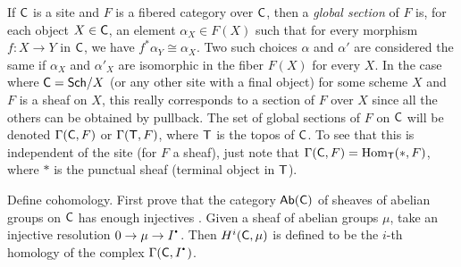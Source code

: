 

If $\text{\sf C}$ is a site and $F$ is a fibered category over $\text{\sf C}$, then a \emph{global section} of $F$ is, for each object $X\in \text{\sf C}$, an element $\alpha_X\in F(X)$ such that for every morphism $f:X\to Y$ in $\text{\sf C}$, we have $f^*\alpha_Y\cong\alpha_X$. Two such choices $\alpha$ and $\alpha'$ are considered the same if $\alpha_X$ and $\alpha'_X$ are isomorphic in the fiber $F(X)$ for every $X$. In the case where $\text{\sf C}=\text{\sf Sch}/X$ (or any other site with a final object) for some scheme $X$ and $F$ is a sheaf on $X$, this really corresponds to a section of $F$ over $X$ since all the others can be obtained by pullback. The set of global sections of $F$ on $\text{\sf C}$ will be denoted $\Gamma(\text{\sf C},F)$ or $\Gamma(\text{\sf T},F)$, where $\text{\sf T}$ is the topos of $\text{\sf C}$. To see that this is independent of the site (for $F$ a sheaf), just note that $\Gamma(\text{\sf C},F)=\operatorname{Hom}_{\text{\sf T}}(\ast,F)$, where $\ast$ is the punctual sheaf (terminal object in $\text{\sf T}$). 

Define cohomology. First prove that the category $\text{\sf Ab}(\text{\sf C})$ of sheaves of abelian groups on $\text{\sf C}$ has enough injectives . Given a sheaf of abelian groups $\mu$, take an injective resolution $0\to \mu\to I^\udot$. Then $H^i(\text{\sf C},\mu)$ is defined to be the $i$-th homology of the complex $\Ga(\C,I^\udot)$.



